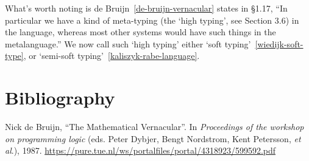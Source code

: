 \begin{remark}
What's worth noting is de Bruijn~\ref{de-bruijn-vernacular} states
in \S{1.17}, ``In particular we have a kind of meta-typing (the `high
typing', see Section {3.6}) in the language, whereas most other systems
would have such things in the metalanguage.'' We now call such `high
typing' either `soft typing'~\ref{wiedijk-soft-type}, or `semi-soft
typing'~\ref{kaliszyk-rabe-language}.
\end{remark}

\section{Bibliography}

\begin{enumerate}[label={[\arabic*]},left=0pt]
\item\label{de-bruijn-vernacular} Nick de Bruijn,
  ``The Mathematical Vernacular''.
  In \emph{Proceedings of the workshop on programming logic}
  (eds. Peter Dybjer, Bengt Nordstrom, Kent Petersson, \emph{et al}.),
  1987. \url{https://pure.tue.nl/ws/portalfiles/portal/4318923/599592.pdf}


\end{enumerate}
